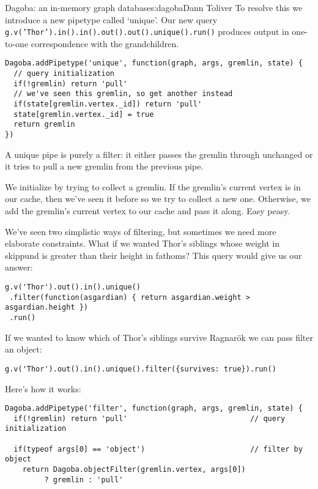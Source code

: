 \begin{aosachapter}{Dagoba: an in-memory graph database}{s:dagoba}{Dann Toliver}
To resolve this we introduce a new pipetype called `unique'. Our new
query \texttt{g.v('Thor').in().in().out().out().unique().run()} produces
output in one-to-one correspondence with the grandchildren.

\begin{verbatim}
Dagoba.addPipetype('unique', function(graph, args, gremlin, state) {
  // query initialization
  if(!gremlin) return 'pull'                            
  // we've seen this gremlin, so get another instead
  if(state[gremlin.vertex._id]) return 'pull'
  state[gremlin.vertex._id] = true
  return gremlin
})
\end{verbatim}

A unique pipe is purely a filter: it either passes the gremlin through
unchanged or it tries to pull a new gremlin from the previous pipe.

We initialize by trying to collect a gremlin. If the gremlin's current
vertex is in our cache, then we've seen it before so we try to collect a
new one. Otherwise, we add the gremlin's current vertex to our cache and
pass it along. Easy peasy.

\label{filter}

We've seen two simplistic ways of filtering, but sometimes we need more
elaborate constraints. What if we wanted Thor's siblings whose weight in
skippund is greater than their height in fathoms? This query would give
us our answer:

\begin{verbatim}
g.v('Thor').out().in().unique()
 .filter(function(asgardian) { return asgardian.weight > asgardian.height })
 .run()
\end{verbatim}

If we wanted to know which of Thor's siblings survive Ragnarök we can
pass filter an object:

\begin{verbatim}
g.v('Thor').out().in().unique().filter({survives: true}).run()
\end{verbatim}

Here's how it works:

\begin{verbatim}
Dagoba.addPipetype('filter', function(graph, args, gremlin, state) {
  if(!gremlin) return 'pull'                            // query initialization

  if(typeof args[0] == 'object')                        // filter by object
    return Dagoba.objectFilter(gremlin.vertex, args[0]) 
         ? gremlin : 'pull'


\end{verbatim}
\end{aosachapter}
